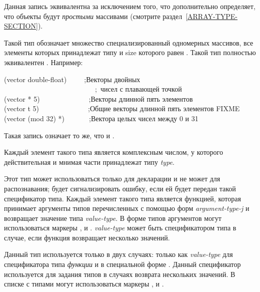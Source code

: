 \begin{flushdesc}
\item[\cd{(simple-array \emph{element-type} \emph{sizes})}]
  Данная запись эквивалентна  за
  исключением того, что дополнительно определяет, что объекты будут \emph{простыми}
  массивами (смотрите раздел~\ref{ARRAY-TYPE-SECTION}).

\item[\cd{(vector \emph{element-type} \emph{size})}]
  Такой тип обозначает множество специализированный одномерных массивов, все элементы
  которых принадлежат типу  и size которого равен
  . Такой тип полностью эквивалентен .
  Например:
  \begin{lisp}
    (vector double-float)~~~~~;\textrm{Векторы двойных } \\
    ~~~~~~~~~~~~~~~~~~~~~~~~~~;~\textrm{чисел с плавающей точкой} \\
    (vector * 5)~~~~~~~~~~~~~~;\textrm{Векторы длинной пять элементов} \\
    (vector t 5)~~~~~~~~~~~~~~;\textrm{Общие векторы длинной пять элементов FIXME} \\
    (vector (mod 32) *)~~~~~~~;\textrm{Вектора целых чисел между 0 и 31}
  \end{lisp}

\item[\cd{(simple-vector \emph{size})}]
  Такая запись означает то же, что и .

\item[\cd{(complex \emph{type})}]
  Каждый элемент такого типа является комплексным числом, у которого
  действительная и мнимая части принадлежат типу \emph{type}.

\item[\cd{(function (\emph{argument-type-1} \emph{argument-type-2} ...) \emph{value-type})}]
  \relax Этот тип может использоваться только для декларации и не может для
  распознавания;  будет сигнализировать ошибку, если ей будет передан
  такой спецификатор типа. Каждый элемент такого типа является функцией, которая
  принимает аргументы типов перечисленных с помощью форм \emph{argument-type-j}
  и возвращает значение типа \emph{value-type}. В форме типов аргументов могут
  использоваться маркеры ,  и
  . \emph{value-type} может быть спецификатором типа  в
  случае, если функция возвращает несколько значений.

\item[\cd{(values \emph{value-type-1} \emph{value-type-2} ...)}]
  Данный тип используется только в двух случаях: только как \emph{value-type}
  для спецификатора типа \emph{функции} и в специальной форме . Данный
  спецификатор используется для задания типов в случаях возврата нескольких
  значений.
  В списке с типами могут использоваться маркеры ,  и
  .
\end{flushdesc}

